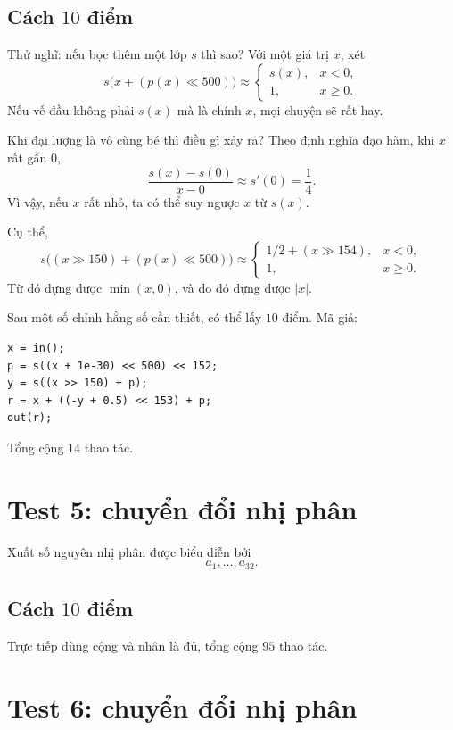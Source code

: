 \documentclass[11pt]{article}
\begin{document}
\subsection*{Cách $10$ điểm}

Thử nghĩ: nếu bọc thêm một lớp $s$ thì sao? Với một giá trị $x$, xét
\[
  s\bigl(x+(p(x)\ll 500)\bigr)\approx
  \begin{cases}
    s(x), & x<0,\\
    1, & x\ge 0.
  \end{cases}
\]
Nếu vế đầu không phải $s(x)$ mà là chính $x$, mọi chuyện sẽ rất hay.

Khi đại lượng là vô cùng bé thì điều gì xảy ra? Theo định nghĩa đạo hàm, khi
$x$ rất gần $0$,
\[
  \frac{s(x)-s(0)}{x-0}\approx s'(0)=\frac14.
\]
Vì vậy, nếu $x$ rất nhỏ, ta có thể suy ngược $x$ từ $s(x)$.

Cụ thể,
\[
  s\bigl((x\gg 150)+(p(x)\ll 500)\bigr)\approx
  \begin{cases}
    1/2+(x\gg 154), & x<0,\\
    1, & x\ge 0.
  \end{cases}
\]
Từ đó dựng được $\min(x,0)$, và do đó dựng được $\lvert x\rvert$.

Sau một số chỉnh hằng số cần thiết, có thể lấy $10$ điểm. Mã giả:

\begin{verbatim}
x = in();
p = s((x + 1e-30) << 500) << 152;
y = s((x >> 150) + p);
r = x + ((-y + 0.5) << 153) + p;
out(r);
\end{verbatim}

Tổng cộng $14$ thao tác.

\section{Test 5: chuyển đổi nhị phân}

Xuất số nguyên nhị phân được biểu diễn bởi
\[
  a_1,\ldots,a_{32}.
\]

\subsection*{Cách $10$ điểm}

Trực tiếp dùng cộng và nhân là đủ, tổng cộng $95$ thao tác.

\section{Test 6: chuyển đổi nhị phân}
\end{document}
